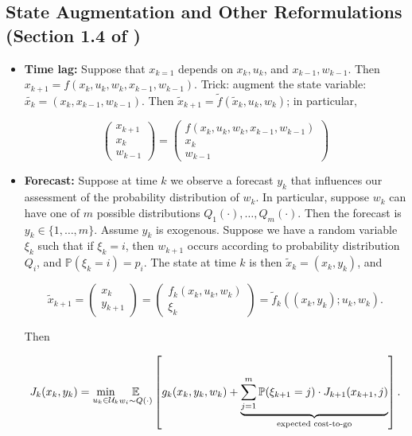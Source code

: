 \subsection{State Augmentation and Other Reformulations (Section 1.4 of \citep{v1_bertsekas2012dynamic})}


\begin{itemize}

\item \textbf{Time lag:} Suppose that \(x_{k=1}\) depends on \(x_k, u_k\), and \(x_{k-1}, w_{k-1}\). Then \(x_{k+1} = f(x_k, u_k, w_k, x_{k-1}, w_{k-1})\). Trick: augment the state variable: \(\tilde{x_k} = (x_k, x_{k-1}, w_{k-1})\). Then \(\tilde{x}_{k+1} = \tilde{f}(\tilde{x}_k, u_k, w_k)\); in particular,

\[
\begin{pmatrix}
x_{k+1} \\
x_k \\
w_{k-1}
\end{pmatrix} = \begin{pmatrix}
 f(x_k, u_k, w_k, x_{k-1}, w_{k-1}) \\
x_k \\
w_{k-1}
\end{pmatrix} 
\]

\item \textbf{Forecast:} Suppose at time \(k\) we observe a forecast \(y_k\) that influences our assessment of the probability distribution of \(w_k\). In particular, suppose \(w_k\) can have one of \(m\) possible distributions \(Q_1(\cdot), \ldots, Q_m(\cdot)\). Then the forecast is \(y_k \in \{1, \ldots, m\}\). Assume \(y_k\) is exogenous. Suppose we have a random variable \(\xi_k\) such that if \(\xi_k = i\), then \(w_{k+1}\) occurs according to probability distribution \(Q_i\), and \(\mathbb{P}(\xi_k = i) = p_i\). The state at time \(k\) is then \(\tilde{x}_k = (x_k, y_k)\), and

\[
\tilde{x}_{k+1} = \begin{pmatrix}
x_k \\
y_{k+1}
\end{pmatrix} = \begin{pmatrix}
f_k(x_k, u_k, w_k) \\
\xi_k
\end{pmatrix} = \tilde{f}_k((x_k, y_k); u_k, w_k).
\]

Then

\[
J_k(x_k, y_k) = \underset{u_k \in \mathcal{U}_k}{\min} \underset{w_i \sim Q(\cdot)}{\mathbb{E}} \left[ g_k(x_k, y_k, w_k) + \underbrace{\sum_{j=1}^m \mathbb{P}(\xi_{k+1} = j) \cdot J_{k+1}(x_{k+1}, j)}_{\text{expected cost-to-go}}\right].
\]


\end{itemize}
